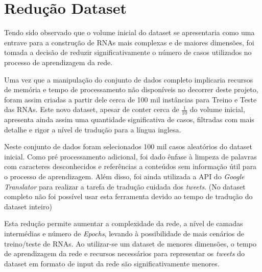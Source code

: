 \section{Redução Dataset}
\label{sec:reducaodataset}

Tendo sido observado que o volume inicial do dataset se apresentaria como uma entrave para a construção de RNAs mais complexas e de maiores dimensões, foi tomada a decisão de reduzir significativamente o número de casos utilizados no processo de aprendizagem da rede. 

Uma vez que a manipulação do conjunto de dados completo implicaria recursos de memória e tempo de processamento não disponíveis no decorrer deste projeto, foram assim criadas a partir dele cerca de 100 mil instâncias para Treino e Teste das RNAs. 
Este novo dataset, apesar de conter cerca de $\frac{1}{10}$ do volume inicial, apresenta ainda assim uma quantidade significativa de casos, filtradas com mais detalhe e rigor a nível de tradução para a língua inglesa. 

Neste conjunto de dados foram selecionados 100 mil casos aleatórios do dataset inicial. 
Como pré processamento adicional, foi dado ênfase à limpeza de palavras com caracteres desconhecidos e referências a conteúdos sem informação útil para o processo de aprendizagem. 
Além disso, foi ainda utilizada a API do \textit{Google Translator} para realizar a tarefa de tradução cuidada dos \textit{tweets}. (No dataset completo não foi possível usar esta ferramenta devido ao tempo de tradução do dataset inteiro)

Esta redução permite aumentar a complexidade da rede, a nível de camadas intermédias e número de \textit{Epochs}, levando à possibilidade de mais cenários de treino/teste de RNAs. 
Ao utilizar-se um dataset de menores dimensões, o tempo de aprendizagem da rede e recursos necessários para representar os \textit{tweets} do dataset em formato de input da rede são significativamente menores.
